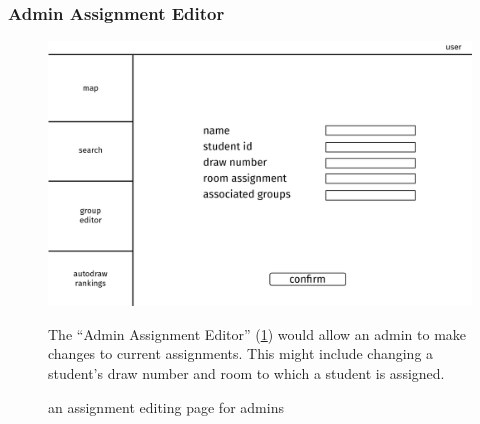 \subsubsection{Admin Assignment Editor}
\begin{figure} \centering
\includegraphics[scale=.15]{wireframe/admin_assignment_editor}
\caption{an assignment editing page for admins}
\label{fig:wireadmin-assignment-editor}

The ``Admin Assignment Editor'' (\cref{fig:wireadmin-assignment-editor}) would
allow an admin to make changes to current assignments. This might include
changing a student's draw number and room to which a student is assigned.
\end{figure}